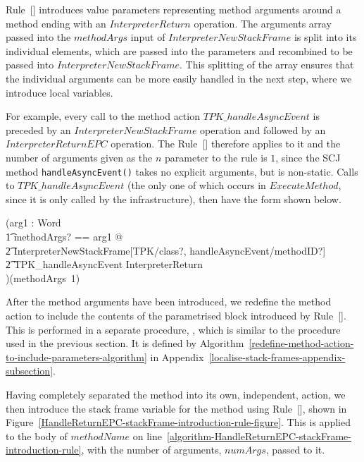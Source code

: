 Rule~[] introduces value
parameters representing method arguments around a method ending with
an $InterpreterReturn$ operation.
The arguments array passed into the $methodArgs$ input of
$InterpreterNewStackFrame$ is split into its individual elements,
which are passed into the parameters and recombined to be passed into
$InterpreterNewStackFrame$.
This splitting of the array ensures that the individual arguments can
be more easily handled in the next step, where we introduce local
variables.

For example, every call to the method action $TPK\_handleAsyncEvent$
is preceded by an $InterpreterNewStackFrame$ operation and followed by
an $InterpreterReturnEPC$ operation.
The Rule~[] therefore applies to
it and the number of arguments given as the $n$ parameter to the rule
is $1$, since the SCJ method \texttt{handleAsyncEvent()} takes no
explicit arguments, but is non-static.
Calls to $TPK\_handleAsyncEvent$ (the only one of which occurs in
$ExecuteMethod$, since it is only called by the infrastructure), then
have the form shown below.
\begin{circus}
  (\circval arg1 : Word \circspot \\
      \t1 \lschexpract \exists methodArgs? == \langle arg1 \rangle @ \\
      \t2 InterpreterNewStackFrame[TPK/class?, handleAsyncEvent/methodID?] \rschexpract \circseq \\
      \t2 TPK\_handleAsyncEvent \circseq \lschexpract InterpreterReturn \rschexpract \\
      )(methodArgs~1)
\end{circus}

After the method arguments have been introduced, we redefine the
method action to include the contents of the parametrised block
introduced by Rule~[].
This is performed in a separate procedure,
, which is similar to
the  procedure used
in the previous section.
It is defined by
Algorithm~\ref{redefine-method-action-to-include-parameters-algorithm}
in Appendix~\ref{localise-stack-frames-appendix-subsection}.

Having completely separated the method into its own, independent,
action, we then introduce the stack frame variable for the method
using Rule~[],
shown in
Figure~\ref{HandleReturnEPC-stackFrame-introduction-rule-figure}.
This is applied to the body of $methodName$ on
line~\ref{algorithm-HandleReturnEPC-stackFrame-introduction-rule},
with the number of arguments, $numArgs$, passed to it.

